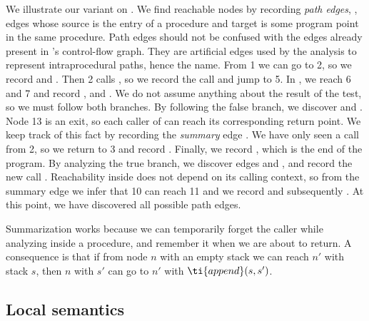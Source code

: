 \documentclass{LMCS}
\theoremstyle{definition} \newtheorem{property}[thm]{Property}
\begin{document}
We illustrate our variant on .
We find reachable nodes by recording \emph{path edges}, \ie, edges whose source
is the entry of a procedure and target is some program point in the same 
procedure.
Path edges should not be confused with the edges already present in 's
control-flow graph.
They are artificial edges used by the analysis to represent intraprocedural 
paths, hence the name.
From 1 we can go to 2, so we record  and .
Then 2 calls , so we record the call  and jump to 5.
In , we reach 6 and 7 and record ,  and 
.
We do not assume anything about the result of the test, so we must follow both
branches.
By following the false branch, we discover  and .
Node 13 is an exit, so each caller of  can reach its corresponding 
return point.
We keep track of this fact by recording the \emph{summary} edge .
We have only seen a call from 2, so we return to 3 and record .
Finally, we record , which is the end of the program.
By analyzing the true branch, we discover edges  and ,
and record the new call .
Reachability inside  does not depend on its calling context, so from the
summary edge  we infer that 10 can reach 11 and we record 
 and subsequently .
At this point, we have discovered all possible path edges.

Summarization works because we can temporarily forget the caller while
analyzing inside a procedure, and remember it when we are about to return.
A consequence is that if from node $n$ with an empty stack we can reach $n'$ 
with stack $s$, then $n$ with $s'$ can go to $n'$ with $\ti{append}(s, s')$.


\subsection{Local semantics\label{subsec:localsems}}
\end{document}
